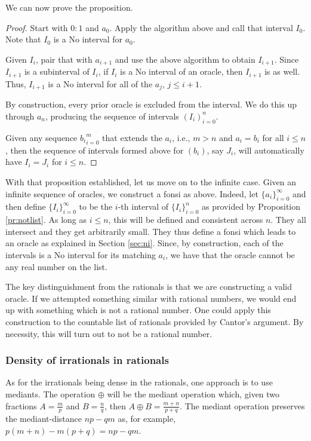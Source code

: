 \documentclass[12pt]{article}
\begin{document}
We can now prove the proposition.

\begin{proof}
Start with $0:1$ and $a_0$. Apply the algorithm above and call that interval $I_0$. Note that $I_0$ is a No interval for $a_0$. 

Given $I_i$, pair that with $a_{i+1}$ and use the above algorithm to obtain $I_{i+1}$. Since $I_{i+1}$ is a subinterval of $I_i$, if $I_i$ is a No interval of an oracle, then $I_{i+1}$ is as well. Thus, $I_{i+1}$ is a No interval for all of the $a_j$, $j \leq i+1$.

By construction, every prior oracle is excluded from the interval. We do this up through $a_n$, producing the sequence of intervals $(I_i)_{i=0}^n$. 

Given any sequence ${b_i}_{i=0}^m$ that extends the $a_i$, i.e., $m>n$ and $a_i = b_i$ for all $i \leq n$, then the sequence of intervals formed above for $(b_i)$, say $J_i$, will automatically have $I_i = J_i$ for $i \leq n$. 

\end{proof} 

With that proposition established, let us move on to the infinite case. Given an infinite sequence of oracles, we construct a fonsi as above. Indeed, let $\{a_i\}_{i=0}^{\infty}$ and then define $\{I_i\}_{i=0}^{\infty}$ to be the $i$-th interval of $\{I_i\}_{i=0}^{n}$ as provided by Proposition \ref{pr:notlist}. As long as $i \leq n$, this will be defined and consistent across $n$. They all intersect and they get arbitrarily small. They thus define a fonsi which leads to an oracle as explained in Section \ref{sec:ni}. Since, by construction, each of the intervals is a No interval for its matching $a_i$, we have that the oracle cannot be any real number on the list. 

The key distinguishment from the rationals is that we are constructing a valid oracle. If we attempted something similar with rational numbers, we would end up with something which is not a rational number. One could apply this construction to the countable list of rationals provided by Cantor's argument. By necessity, this will turn out to not be a rational number. 

\subsubsection{Density of irrationals in rationals}

As for the irrationals being dense in the rationals, one approach is to use mediants. The operation $\oplus$ will be the mediant operation which, given two fractions $A = \frac{m}{p}$ and $B= \frac{n}{q}$, then $A \oplus B = \frac{m+n}{p+q}$. The mediant operation preserves the mediant-distance $np - qm$ as, for example, $p(m+n) - m(p+q)  = np - qm$. 
\end{document}
